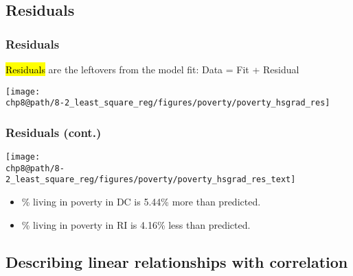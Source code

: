 \documentclass[slidestop,compress,mathserif]{beamer}
\makeatletter
\def\chp8@path{../../Chp 8}
\makeatother
\begin{document}

\subsection{Residuals}


\begin{frame}
\frametitle{Residuals}

\hl{Residuals} are the leftovers from the model fit: Data = Fit + Residual

\begin{center}
\texttt{[image: \\chp8@path/8-2\_least\_square\_reg/figures/poverty/poverty\_hsgrad\_res]}
\end{center}

\end{frame}


\begin{frame}
\frametitle{Residuals (cont.)}

\vspace{-0.5cm}
{
\begin{center}
\texttt{[image: \\chp8@path/8-2\_least\_square\_reg/figures/poverty/poverty\_hsgrad\_res\_text]}
\end{center}
}
{
\pause
\begin{itemize}
\item \% living in poverty in DC is 5.44\% more than predicted.
\pause
\item \% living in poverty in RI is 4.16\% less than predicted.
\end{itemize}
}


\end{frame}


\subsection{Describing linear relationships with correlation}

\end{document}
